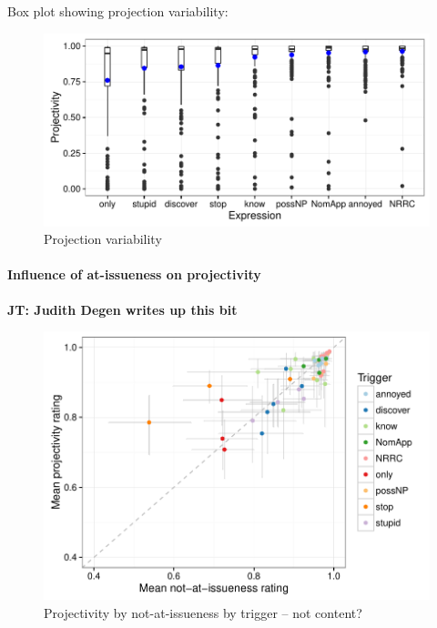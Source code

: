 \documentclass[11pt,fleqn]{article}
\newcommand{\6}{\mbox{$[\hspace*{-.6mm}[$}}
\newcommand{\9}{\mbox{$]\hspace*{-.6mm}]$}}
\newcommand{\jt}[1]{\textbf{\color{blue}JT: #1}}
\begin{document}
Box plot showing projection variability:

\begin{figure}[!h]

\begin{center}
\includegraphics[width=12cm]{../results/exp1a/graphs/boxplot-projection}

\end{center}
\caption{Projection variability}
\label{f-proj-1a}
\end{figure}


\paragraph{Influence of at-issueness on projectivity}

\jt{Judith Degen writes up this bit}

\begin{figure}[!h]

\begin{center}
\includegraphics[width=12cm]{../results/exp1a/graphs/ai-proj-bytrigger-nofacets}

\end{center}

\caption{Projectivity by not-at-issueness by trigger -- not content?}\label{f-proj-ai-1a}
\end{figure}
\end{document}
